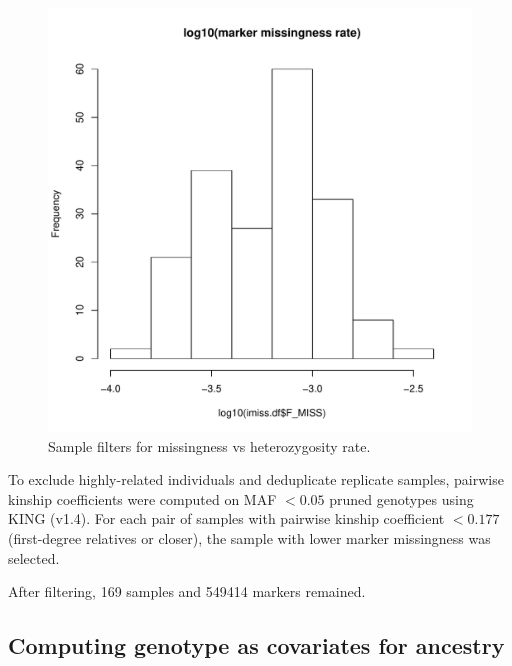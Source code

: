 \begin{figure}
    \includegraphics[width=1.0\textwidth,page=2]{mainmatter/figures/chapter_02/coreex_eQTLflu_20171204.gencall.smajor.impute_sex.qc2.pdf}
    \caption{Sample filters for missingness vs heterozygosity rate.}
    \label{fig:hird_genotype_sample_hetRate_missingness}
\end{figure}

To exclude highly-related individuals and deduplicate replicate samples, pairwise kinship coefficients were computed on \gls{MAF} $< 0.05$ pruned genotypes using KING (v1.4).
For each pair of samples with pairwise kinship coefficient $< 0.177$ (first-degree relatives or closer), the sample with lower marker missingness was selected.

After filtering, 169 samples and 549414 markers remained.

\subsection{Computing genotype  as covariates for ancestry}

